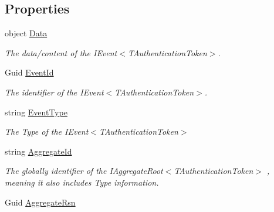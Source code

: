 \subsection*{Properties}
\begin{DoxyCompactItemize}
\item 
object \hyperlink{classCqrs_1_1Events_1_1EventData_ae001b9d06977e5fd407744459fad2da5_ae001b9d06977e5fd407744459fad2da5}{Data}
\begin{DoxyCompactList}\small\item\em The data/content of the I\+Event$<$\+T\+Authentication\+Token$>$. \end{DoxyCompactList}\item 
Guid \hyperlink{classCqrs_1_1Events_1_1EventData_a020c856c1e3a97d8783ccf0ba86c6f59_a020c856c1e3a97d8783ccf0ba86c6f59}{Event\+Id}
\begin{DoxyCompactList}\small\item\em The identifier of the I\+Event$<$\+T\+Authentication\+Token$>$. \end{DoxyCompactList}\item 
string \hyperlink{classCqrs_1_1Events_1_1EventData_a11b4f2ea845000dea4148a94d4c6ba93_a11b4f2ea845000dea4148a94d4c6ba93}{Event\+Type}
\begin{DoxyCompactList}\small\item\em The Type of the I\+Event$<$\+T\+Authentication\+Token$>$ \end{DoxyCompactList}\item 
string \hyperlink{classCqrs_1_1Events_1_1EventData_a0079e7f2307d3fc54063317edb71ffc2_a0079e7f2307d3fc54063317edb71ffc2}{Aggregate\+Id}
\begin{DoxyCompactList}\small\item\em The globally identifier of the I\+Aggregate\+Root$<$\+T\+Authentication\+Token$>$ , meaning it also includes Type information. \end{DoxyCompactList}\item 
Guid \hyperlink{classCqrs_1_1Events_1_1EventData_a562ea218ea8f517a980452097239c774_a562ea218ea8f517a980452097239c774}{Aggregate\+Rsn}

\end{DoxyCompactItemize}
